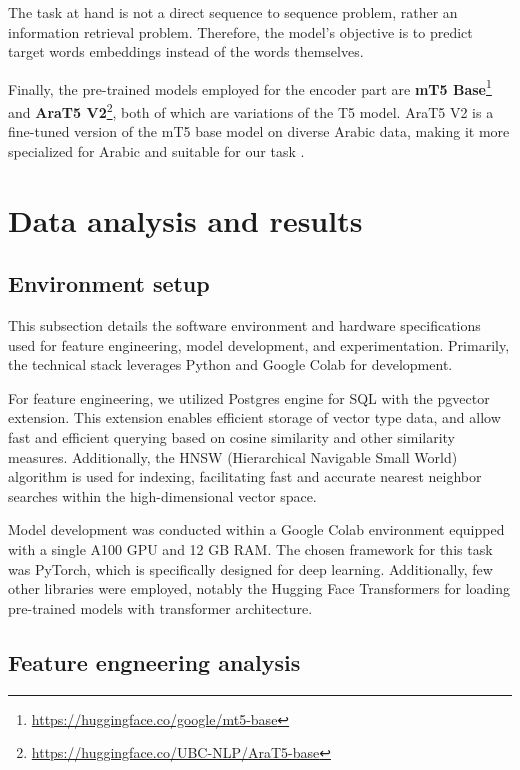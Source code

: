 \documentclass[12pt]{article}
\begin{document}
The task at hand is not a direct sequence to sequence problem, rather an information retrieval problem. Therefore, the model's objective is to predict target words embeddings instead of the words themselves.

Finally, the pre-trained models employed for the encoder part are \textbf{mT5 Base}\footnote{\href{https://huggingface.co/google/mt5-base}{https://huggingface.co/google/mt5-base}} and \textbf{AraT5 V2}\footnote{\href{https://huggingface.co/UBC-NLP/AraT5-base}{https://huggingface.co/UBC-NLP/AraT5-base}}, both of which are variations of the T5 model. AraT5 V2 is a fine-tuned version of the mT5 base model on diverse Arabic data, making it more specialized for Arabic and suitable for our task \cite{Nagoudi2021}.

\newpage

\section{Data analysis and results}

\subsection{Environment setup}

This subsection details the software environment and hardware specifications used for feature engineering, model development, and experimentation. Primarily, the technical stack leverages Python and Google Colab for development.

For feature engineering, we utilized Postgres engine for SQL with the pgvector extension. This extension enables efficient storage of vector type data, and allow fast and efficient querying based on cosine similarity and other similarity measures. Additionally, the HNSW (Hierarchical Navigable Small World) algorithm is used for indexing, facilitating fast and accurate nearest neighbor searches within the high-dimensional vector space.

Model development was conducted within a Google Colab environment equipped with a single A100 GPU and 12 GB RAM. The chosen framework for this task was PyTorch, which is specifically designed for deep learning. Additionally, few other libraries were employed, notably the Hugging Face Transformers for loading pre-trained models with transformer architecture.

\subsection{Feature engneering analysis}
\end{document}
